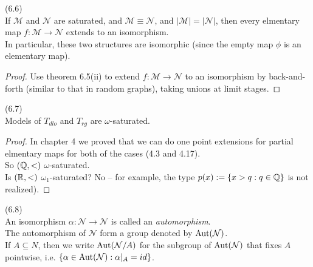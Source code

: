 \documentclass[a4paper]{article}
\begin{document}
\begin{coro} (6.6)\\
    If $\mathcal{M}$ and $\mathcal{N}$ are saturated, and $\mathcal{M} \equiv \mathcal{N}$, and $|\mathcal{M}| = |\mathcal{N}|$, then every elmentary map $f:\mathcal{M} \to \mathcal{N}$ extends to an isomorphism.\\
    In particular, these two structures are isomorphic (since the empty map $\phi$ is an elementary map).
    \begin{proof}
        Use theorem 6.5(ii) to extend $f:\mathcal{M} \to \mathcal{N}$ to an isomorphism by back-and-forth (similar to that in random graphs), taking unions at limit stages.
    \end{proof}
\end{coro}

\begin{coro} (6.7)\\
    Models of $T_{dlo}$ and $T_{rg}$ are $\omega$-saturated.
    \begin{proof}
        In chapter 4 we proved that we can do one point extensions for partial elmentary maps for both of the cases (4.3 and 4.17).\\
        So $(\mathbb{Q},<)$ $\omega$-saturated.\\
        Is $(\mathbb{R},<)$ $\omega_1$-saturated? No -- for example, the type $p(x):= \{x>q: q \in \mathbb{Q}\}$ is not realized).
    \end{proof}
\end{coro}

\begin{defi} (6.8)\\
    An isomorphism $\alpha:\mathcal{N} \to \mathcal{N}$ is called an \emph{automorphism}.\\
    The automorphism of $\mathcal{N}$ form a group denoted by $\operatorname{Aut}(\mathcal{N})$.\\
    If $A \subseteq N$, then we write $\operatorname{Aut}(\mathcal{N}/A)$ for the subgroup of $\operatorname{Aut}(\mathcal{N})$ that fixes $A$ pointwise, i.e. $\{\alpha \in \operatorname{Aut}(\mathcal{N}):\alpha|_A = id\}$.
\end{defi}
\end{document}
